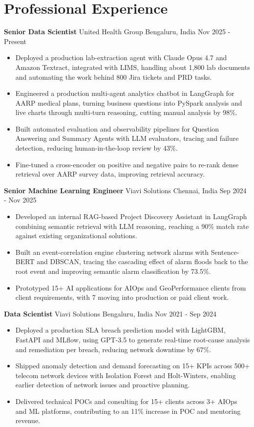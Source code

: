 \documentclass[10pt,a4paper]{article}
\newcommand{\role}[4]{\textbf{#1} \textbar{} #2 \hfill #3 \textbar{} #4\par}
\begin{document}
\section{Professional Experience}
\role{Senior Data Scientist}{United Health Group}{Bengaluru, India}{Nov 2025 - Present}
\begin{itemize}
  \item Deployed a production lab-extraction agent with Claude Opus 4.7 and Amazon Textract, integrated with LIMS, handling about 1,800 lab documents and automating the work behind 800 Jira tickets and PRD tasks.
  \item Engineered a production multi-agent analytics chatbot in LangGraph for AARP medical plans, turning business questions into PySpark analysis and live charts through multi-turn reasoning, cutting manual analysis by 98\%.
  \item Built automated evaluation and observability pipelines for Question Answering and Summary Agents with LLM evaluators, tracing and failure detection, reducing human-in-the-loop review by 43\%.
  \item Fine-tuned a cross-encoder on positive and negative pairs to re-rank dense retrieval over AARP survey data, improving retrieval accuracy.
\end{itemize}
\vspace{3pt}
\role{Senior Machine Learning Engineer}{Viavi Solutions}{Chennai, India}{Sep 2024 - Nov 2025}
\begin{itemize}
  \item Developed an internal RAG-based Project Discovery Assistant in LangGraph combining semantic retrieval with LLM reasoning, reaching a 90\% match rate against existing organizational solutions.
  \item Built an event-correlation engine clustering network alarms with Sentence-BERT and DBSCAN, tracing the cascading effect of alarm floods back to the root event and improving semantic alarm classification by 73.5\%.
  \item Prototyped 15+ AI applications for AIOps and GeoPerformance clients from client requirements, with 7 moving into production or paid client work.
\end{itemize}
\vspace{3pt}
\role{Data Scientist}{Viavi Solutions}{Bengaluru, India}{Nov 2021 - Sep 2024}
\begin{itemize}
  \item Deployed a production SLA breach prediction model with LightGBM, FastAPI and MLflow, using GPT-3.5 to generate real-time root-cause analysis and remediation per breach, reducing network downtime by 67\%.
  \item Shipped anomaly detection and demand forecasting on 15+ KPIs across 500+ telecom network devices with Isolation Forest and Holt-Winters, enabling earlier detection of network issues and proactive planning.
  \item Delivered technical POCs and consulting for 15+ clients across 3+ AIOps and ML platforms, contributing to an 11\% increase in POC and mentoring revenue.
\end{itemize}
\end{document}
